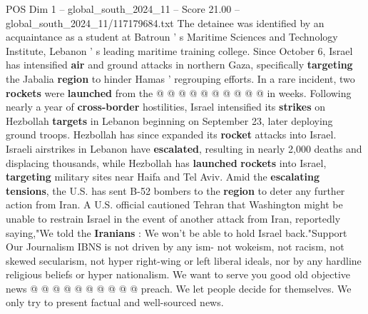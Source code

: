 \begin{textsample}{POS Dim 1 – global\_south\_2024\_11 – Score 21.00 – global\_south\_2024\_11/117179684.txt}
The detainee was identified by an acquaintance as a student at Batroun ' s Maritime Sciences and Technology Institute, Lebanon ' s leading maritime training college.
Since October 6, Israel has intensified \textbf{air} and ground attacks in northern Gaza, specifically \textbf{targeting} the Jabalia \textbf{region} to hinder Hamas ' regrouping efforts.
In a rare incident, two \textbf{rockets} were \textbf{launched} from the @ @ @ @ @ @ @ @ @ @ in weeks.
Following nearly a year of \textbf{cross-border} hostilities, Israel intensified its \textbf{strikes} on Hezbollah \textbf{targets} in Lebanon beginning on September 23, later deploying ground troops.
Hezbollah has since expanded its \textbf{rocket} attacks into Israel.
Israeli airstrikes in Lebanon have \textbf{escalated}, resulting in nearly 2,000 deaths and displacing thousands, while Hezbollah has \textbf{launched} \textbf{rockets} into Israel, \textbf{targeting} military sites near Haifa and Tel Aviv.
Amid the \textbf{escalating} \textbf{tensions}, the U.S. has sent B-52 bombers to the \textbf{region} to deter any further action from Iran.
A U.S. official cautioned Tehran that Washington might be unable to restrain Israel in the event of another attack from Iran, reportedly saying,"We told the \textbf{Iranians} : We won't be able to hold Israel back."Support Our Journalism IBNS is not driven by any ism- not wokeism, not racism, not skewed secularism, not hyper right-wing or left liberal ideals, nor by any hardline religious beliefs or hyper nationalism.
We want to serve you good old objective news @ @ @ @ @ @ @ @ @ @ preach.
We let people decide for themselves.
We only try to present factual and well-sourced news.

\end{textsample}
